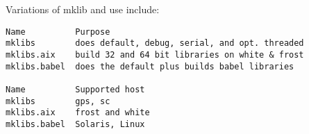 Variations of mklib and use include:
\begin{bfseries}
\begin{verbatim}
Name          Purpose
mklibs        does default, debug, serial, and opt. threaded
mklibs.aix    build 32 and 64 bit libraries on white & frost
mklibs.babel  does the default plus builds babel libraries

Name          Supported host
mklibs        gps, sc
mklibs.aix    frost and white
mklibs.babel  Solaris, Linux
\end{verbatim}
\end{bfseries}
